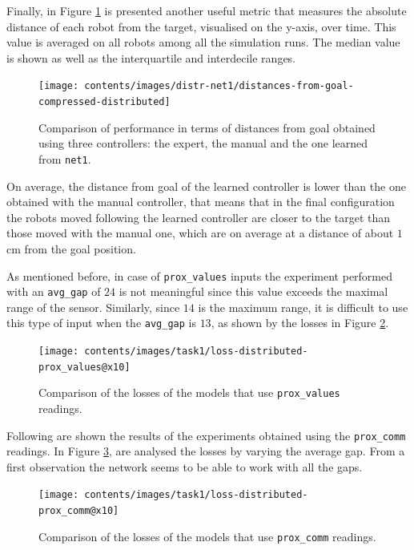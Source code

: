 Finally, in Figure \ref{fig:net1distance} is presented another useful metric that 
measures the absolute distance of each robot from the target, visualised on the 
y-axis, over time. This value is averaged on all robots among all the simulation 
runs. The median value is shown as well as the interquartile and interdecile ranges.
\begin{figure}[!htb]
	\centering
	\texttt{[image: contents/images/distr-net1/distances-from-goal-compressed-distributed]}%
	\caption[Evaluation of \texttt{net1} distances from goal.]{Comparison of 
	performance in terms of distances from goal obtained using three controllers: 
	the expert, the manual and the one learned from \texttt{net1}.}
	\label{fig:net1distance}
\end{figure}
On average, the distance from goal of the learned controller is lower than the one 
obtained with the manual controller, that means that in the final configuration 
the robots moved following the learned controller are closer to the target than 
those moved with the manual one, which are on average at a distance of about 
$1$ \gls{cm} from the goal position. 

As mentioned before, in case of \texttt{prox\_values} inputs the 
experiment performed with an \texttt{avg\_gap} of $24$ is not meaningful since 
this value exceeds the maximal range of the sensor. Similarly, since $14$ is the 
maximum range, it is difficult to use this type of input when the \texttt{avg\_gap}  
is $13$, as shown by the losses in Figure \ref{fig:distlossprox_values}.
\begin{figure}[!htb]
	\centering
	\texttt{[image: contents/images/task1/loss-distributed-prox\_values@x10]}%
	\caption{Comparison of the losses of the models that use \texttt{prox\_values} 
		readings.}
	\label{fig:distlossprox_values}
\end{figure}

Following are shown the results of the experiments obtained using the 
\texttt{prox\_comm} readings. In Figure \ref{fig:distlossprox_comm}, are analysed 
the losses by varying the average gap. From a first observation the network seems 
to be able to work with all the gaps.
\begin{figure}[!htb]
	\centering
	\texttt{[image: contents/images/task1/loss-distributed-prox\_comm@x10]}%
	\caption{Comparison of the losses of the models that use \texttt{prox\_comm} 
	readings.}
	\label{fig:distlossprox_comm}
\end{figure}


